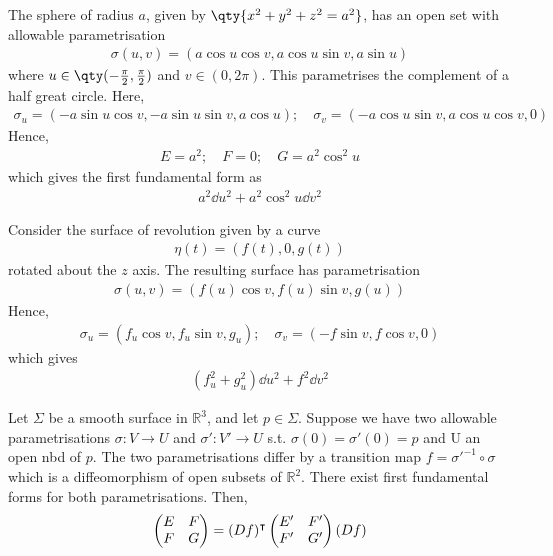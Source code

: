 \begin{example}
	The sphere of radius $a$, given by $\qty{x^2 + y^2 + z^2 = a^2}$, has an open set with allowable parametrisation
	\begin{align*}
		\sigma(u,v) = (a\cos u \cos v, a \cos u \sin v, a \sin u)
	\end{align*}
	where $u \in \qty(-\frac{\pi}{2}, \frac{\pi}{2})$ and $v \in (0,2\pi)$.
	This parametrises the complement of a half great circle.
	Here,
	\begin{align*}
		\sigma_u = (-a \sin u \cos v, -a \sin u \sin v, a \cos u);\quad \sigma_v = (-a \cos u \sin v, a \cos u \cos v, 0)
	\end{align*}
	Hence,
	\begin{align*}
		E = a^2; \quad F = 0;\quad G = a^2 \cos^2 u
	\end{align*}
	which gives the first fundamental form as
	\begin{align*}
		a^2 \dd{u}^2 + a^2 \cos^2 u \dd{v}^2
	\end{align*}
\end{example}

\begin{example}
	Consider the surface of revolution given by a curve
	\begin{align*}
		\eta(t) = (f(t),0,g(t))
	\end{align*}
	rotated about the $z$ axis.
	The resulting surface has parametrisation
	\begin{align*}
		\sigma(u,v) = (f(u) \cos v, f(u) \sin v, g(u))
	\end{align*}
	Hence,
	\begin{align*}
		\sigma_u = (f_u \cos v, f_u \sin v, g_u);\quad \sigma_v = (-f \sin v, f \cos v, 0)
	\end{align*}
	which gives
	\begin{align*}
		(f_u^2 + g_u^2) \dd{u}^2 + f^2 \dd{v}^2
	\end{align*}
\end{example}

\begin{lemma} \label{lem:2.3}
	Let $\Sigma$ be a smooth surface in $\mathbb R^3$, and let $p \in \Sigma$.
	Suppose we have two allowable parametrisations $\sigma \colon V \to U$ and $\sigma' \colon V' \to U$ s.t. $\sigma(0) = \sigma'(0) = p$ and U an open nbd of $p$.
	The two parametrisations differ by a transition map $f = {\sigma'}^{-1} \circ \sigma$ which is a diffeomorphism of open subsets of $\mathbb R^2$.
	There exist first fundamental forms for both parametrisations.
	Then,
	\begin{align*}
		\begin{pmatrix}
			E & F \\
			F & G
		\end{pmatrix} = (Df)^\intercal \begin{pmatrix}
			E' & F' \\
			F' & G'
		\end{pmatrix} (Df)
	\end{align*}
\end{lemma}

